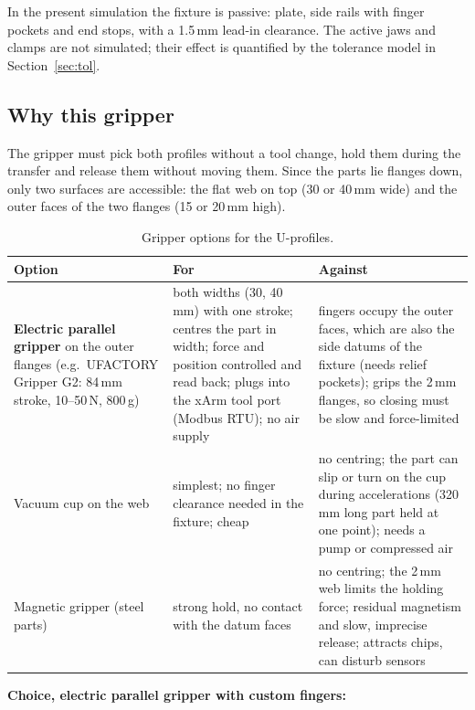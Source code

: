 \documentclass[11pt,a4paper]{article}
\begin{document}
In the present simulation the fixture is passive: plate, side rails with finger pockets and
end stops, with a 1.5\,mm lead-in clearance. The active jaws and clamps are not simulated; their effect is
quantified by the tolerance model in Section~\ref{sec:tol}.

\subsection{Why this gripper}
\label{sec:gripper}

The gripper must pick both profiles without a tool change, hold them during the transfer and
release them without moving them. Since the parts lie flanges down, only two surfaces are
accessible: the flat web on top (30 or 40\,mm wide) and the outer faces of the two flanges
(15 or 20\,mm high).

\begin{table}[H]
\centering
\caption{Gripper options for the U-profiles.}
\label{tab:gripper}
\small
\begin{tabularx}{\textwidth}{@{}p{2.9cm} L L@{}}
\toprule
Option & For & Against\\
\midrule
\textbf{Electric parallel gripper} on the outer flanges (e.g.\ UFACTORY Gripper G2: 84\,mm stroke,
10--50\,N, 800\,g) &
both widths (30, 40\,mm) with one stroke; centres the part in width; force and position
controlled and read back; plugs into the xArm tool port (Modbus RTU); no air supply &
fingers occupy the outer faces, which are also the side datums of the fixture (needs relief
pockets); grips the 2\,mm flanges, so closing must be slow and force-limited\\
Vacuum cup on the web & simplest; no finger clearance needed in the fixture; cheap &
no centring; the part can slip or turn on the cup during accelerations (320\,mm long part held at
one point); needs a pump or compressed air\\
Magnetic gripper (steel parts) & strong hold, no contact with the datum faces &
no centring; the 2\,mm web limits the holding force; residual magnetism and slow, imprecise
release; attracts chips, can disturb sensors\\
\bottomrule
\end{tabularx}
\end{table}

\textbf{Choice, electric parallel gripper with custom fingers:}
\end{document}
